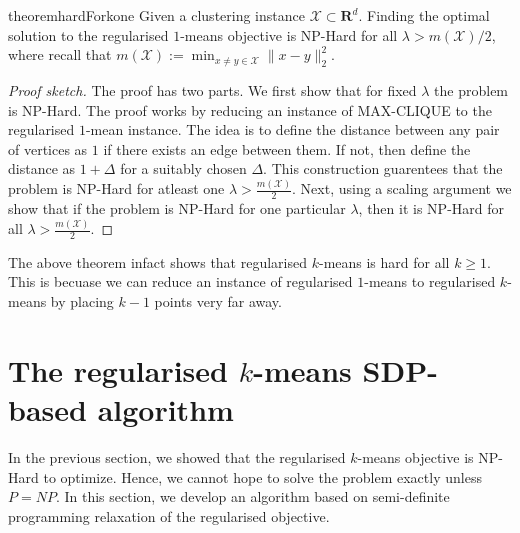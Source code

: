 \documentclass[12pt]{article}
\newcommand{\mc}{\mathcal}
\newcommand{\mb}{\mathbf}
\begin{document}

\begin{restatable}{theorem}{hardForkone}
\label{theorem:hardFork1}
Given a clustering instance $\mc X \subset \mb R^d$. Finding the optimal solution to the regularised $1$-means objective is NP-Hard for all $\lambda > m(\mc X)/2$, where recall that $m(\mc X) := \min_{x\ne y \in \mc X} \|x-y\|_2^2$.
\end{restatable}

\begin{proof}[Proof sketch]
The proof has two parts. We first show that for fixed $\lambda$ the problem is NP-Hard. The proof works by reducing an instance of MAX-CLIQUE to the regularised $1$-mean instance. The idea is to define the distance between any pair of vertices as $1$ if there exists an edge between them. If not, then define the distance as $1 + \Delta$ for a suitably chosen $\Delta$. This construction guarentees that the problem is NP-Hard for atleast one $\lambda > \frac{m(\mc X)}{2}$. Next, using a scaling argument we show that if the problem is NP-Hard for one particular $\lambda$, then it is NP-Hard for all $\lambda > \frac{m(\mc X)}{2}$.
\end{proof}

The above theorem infact shows that regularised $k$-means is hard for all $k \ge 1$. This is becuase we can reduce an instance of regularised $1$-means to regularised $k$-means by placing $k-1$ points very far away. 

\section{The regularised $k$-means SDP-based algorithm}
\label{section:heuristic}
In the previous section, we showed that the regularised $k$-means objective is NP-Hard to optimize. Hence, we cannot hope to solve the problem exactly unless $P=NP$. In this section, we develop an algorithm based on semi-definite programming relaxation of the regularised objective. 
\end{document}
